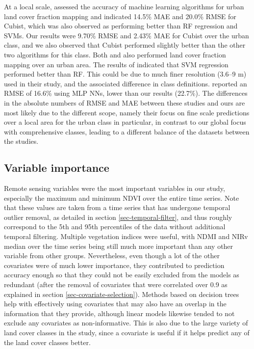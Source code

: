 \documentclass[review,authoryear,3p]{elsarticle}
\begin{document}
At a local scale, \citet{walton2008subpixelrf} assessed the accuracy of machine learning algorithms for urban land cover fraction mapping and indicated 14.5\% \gls{MAE} and 20.0\% \gls{RMSE} for Cubist, which was also observed as performing better than \gls{RF} regression and \glspl{SVM}.
Our results were 9.70\% \gls{RMSE} and 2.43\% \gls{MAE} for Cubist over the urban class, and we also observed that Cubist performed slightly better than the other two algorithms for this class.
Both \citet{okujeni_comparison_2014} and \citet{foody1997fuzzynnet} also performed land cover fraction mapping over an urban area.
The results of \citet{okujeni_comparison_2014} indicated that \gls{SVM} regression performed better than \gls{RF}.
This could be due to much finer resolution (3.6–9 m) used in their study, and the associated difference in class definitions.
\citet{foody1997fuzzynnet} reported an \gls{RMSE} of 16.6\% using \gls{MLP} \glspl{NN}, lower than our results (22.7\%).
The differences in the absolute numbers of \gls{RMSE} and \gls{MAE} between these studies and ours are most likely due to the different scope, namely their focus on fine scale predictions over a local area for the urban class in particular, in contrast to our global focus with comprehensive classes, leading to a different balance of the datasets between the studies.

\subsection{Variable importance}

Remote sensing variables were the most important variables in our study, especially the maximum and minimum \gls{NDVI} over the entire time series.
Note that these values are taken from a time series that has undergone temporal outlier removal, as detailed in section \ref{sec-temporal-filter}, and thus roughly correspond to the 5th and 95th percentiles of the data without additional temporal filtering.
Multiple vegetation indices were useful, with \gls{NDMI} and \gls{NIRv} median over the time series being still much more important than any other variable from other groups.
Nevertheless, even though a lot of the other covariates were of much lower importance, they  contributed to prediction accuracy enough so that they could not be easily excluded from the models as redundant (after the removal of covariates that were correlated over 0.9 as explained in section \ref{sec-covariate-selection}).
Methods based on decision trees help with effectively using covariates that may also have an overlap in the information that they provide, although linear models likewise tended to not exclude any covariates as non-informative.
This is also due to the large variety of land cover classes in the study, since a covariate is useful if it helps predict any of the land cover classes better.
\end{document}
